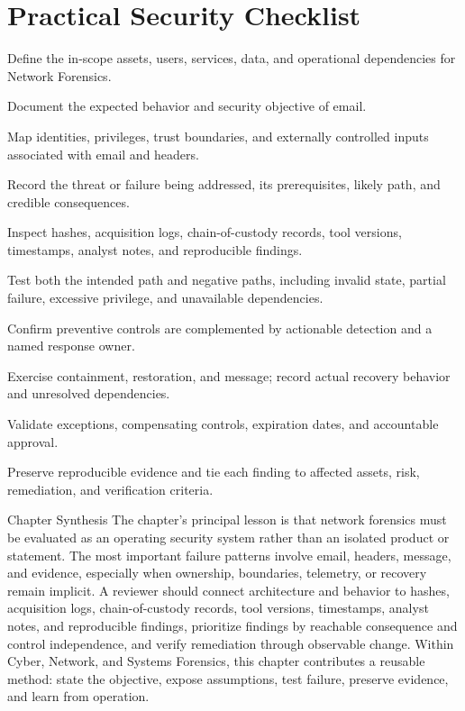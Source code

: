 \documentclass[11pt,letterpaper]{article}
\begin{document}
\section*{Practical Security Checklist}
\begin{CornellChecklist}
\item Define the in-scope assets, users, services, data, and operational dependencies for Network Forensics.
\item Document the expected behavior and security objective of email.
\item Map identities, privileges, trust boundaries, and externally controlled inputs associated with email and headers.
\item Record the threat or failure being addressed, its prerequisites, likely path, and credible consequences.
\item Inspect hashes, acquisition logs, chain-of-custody records, tool versions, timestamps, analyst notes, and reproducible findings.
\item Test both the intended path and negative paths, including invalid state, partial failure, excessive privilege, and unavailable dependencies.
\item Confirm preventive controls are complemented by actionable detection and a named response owner.
\item Exercise containment, restoration, and message; record actual recovery behavior and unresolved dependencies.
\item Validate exceptions, compensating controls, expiration dates, and accountable approval.
\item Preserve reproducible evidence and tie each finding to affected assets, risk, remediation, and verification criteria.
\end{CornellChecklist}
\begin{CornellSummaryBox}{Chapter Synthesis}
The chapter's principal lesson is that network forensics must be evaluated as an operating security system rather than an isolated product or statement. The most important failure patterns involve email, headers, message, and evidence, especially when ownership, boundaries, telemetry, or recovery remain implicit. A reviewer should connect architecture and behavior to hashes, acquisition logs, chain-of-custody records, tool versions, timestamps, analyst notes, and reproducible findings, prioritize findings by reachable consequence and control independence, and verify remediation through observable change. Within Cyber, Network, and Systems Forensics, this chapter contributes a reusable method: state the objective, expose assumptions, test failure, preserve evidence, and learn from operation.
\end{CornellSummaryBox}
\end{document}
